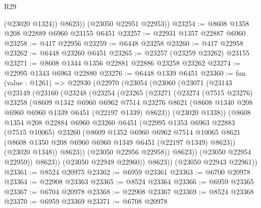 \begin{lexlean}{R29}
\begin{coremodule}
            (@23020 @1324))
          @8623))
      (@23050 @22951 @22953))
@23254 := @8608 @1358 @208 @22889 @6960 @23155 @6451
@23257 := @22931 @1357 @22887 @6960
@23258 := @417 @22956
@23259 := @6448 @23258
@23260 := @417 @22958
@23262 := @6448 @23260 @6451
@23265 := @23257 (@23259 @23262) @23155
@23271 := @8608 @1344 @1356 @22881 @22886 @23258 @23262
@23274 := @22995 @1343 @6963 @22880
@23276 := @6448 @1339 @6451
@23360 := fun (value : @1261) =>
  @22930
    (@22970
      (@23054
        (@23060
          (@23071
            (@23143
              (@23149
                (@23160
                  (@23248
                    (@23254
                      (@23265
                        (@23271
                          (@23274
                            (@7515 @23276)
                            @23258
                            (@8609
                              @1342
                              @6960
                              @6962
                              @7514
                              @23276
                              @8621
                              (@8608 @1340 @208 @6960 @6960 @1339 @6451 (@22197 @1339) @8623))
                            (@23020 @1338))
                          (@8608
                            @1354
                            @208
                            @22884
                            @6960
                            @23260
                            @6451
                            (@22995
                              @1353
                              @6963
                              @22883
                              (@7515 @10065)
                              @23260
                              (@8609
                                @1352
                                @6960
                                @6962
                                @7514
                                @10065
                                @8621
                                (@8608 @1350 @208 @6960 @6960 @1349 @6451 (@22197 @1349) @8623))
                              (@23020 @1348))
                            @8623))
                        (@23050 @22956 @22958))
                      @8623))
                  (@23050 @22954 @22959))
                @8623))
            (@23050 @22949 @22960))
          @8623))
      (@23050 @22943 @22961))
@23361 := @8524 @20975
@23362 := @6959 @23361
@23363 := @6700 @20978
@23364 := @22908 @23363
@23365 := @8524 @23364
@23366 := @6959 @23365
@23367 := @6704 @20978
@23368 := @22908 @23367
@23369 := @8524 @23368
@23370 := @6959 @23369
@23371 := @6708 @20978

\end{coremodule}
\end{lexlean}
